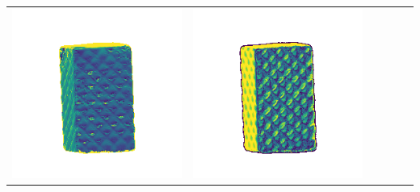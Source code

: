\begin{tabularx}{\linewidth}{@{}Y@{}Y@{}Y@{}Y@{}Y@{}Y@{}}
\includegraphics[width=\linewidth]{semisynthetic/20150514_18_yu_err.png} &
\includegraphics[width=\linewidth]{semisynthetic/20150514_18_dpsn_err.png} &

\end{tabularx}
